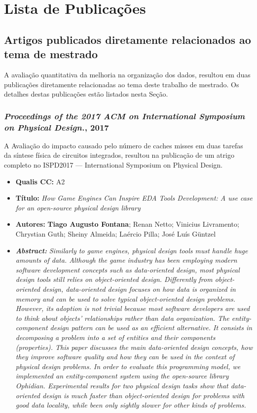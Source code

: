 \chapter{Lista de Publicações}
\label{ap:producoes}
\section{Artigos publicados diretamente relacionados ao tema de mestrado}

A avaliação quantitativa da melhoria na organização dos dados, resultou em duas publicações diretamente relacionadas ao tema deste trabalho de mestrado. Os detalhes destas publicações estão listados nesta Seção.

\subsection{\textit{Proceedings of the 2017 ACM on International Symposium on Physical Design.}, 2017}

A Avaliação do impacto causado pelo número de caches misses em duas tarefas da síntese física de circuitos integrados, resultou na publicação de um atrigo completo no ISPD2017 --- International Symposium on Physical Design. 

\begin{itemize}
\item \textbf{Qualis CC:} A2
\item \textbf{Título:} \textit{How Game Engines Can Inspire EDA Tools Development: A use case for an open-source physical design library}
\item \textbf{Autores:}  \textbf{Tiago Augusto Fontana}; Renan Netto; Vinicius Livramento; Chrystian Guth; Sheiny Almeida; Laércio Pilla; José Luís Güntzel
\item \textbf{\textit{Abstract:}} \emph{Similarly to game engines, physical design tools must handle huge amounts of data. Although the game industry has been employing modern software development concepts such as data-oriented design, most physical design tools still relies on object-oriented design. Differently from object-oriented design, data-oriented design focuses on how data is organized in memory and can be used to solve typical object-oriented design problems. However, its adoption is not trivial because most software developers are used to think about objects' relationships rather than data organization. The entity-component design pattern can be used as an efficient alternative. It consists in decomposing a problem into a set of entities and their components (properties). This paper discusses the main data-oriented design concepts, how they improve software quality and how they can be used in the context of physical design problems. In order to evaluate this programming model, we implemented an entity-component system using the open-source library Ophidian. Experimental results for two physical design tasks show that data-oriented design is much faster than object-oriented design for problems with good data locality, while been only sightly slower for other kinds of problems.}
\end{itemize}


